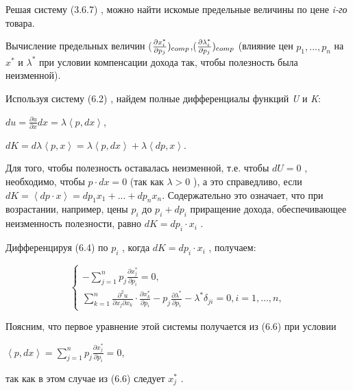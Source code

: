 \documentclass[12pt, 4paper]{book}
\begin{document}
{Решая систему (3.6.7) , можно найти искомые предельные величины по цене \textit{i-го} товара. 
\par

Вычисление предельных величин ($\frac{\partial x_{i}^{*}}{\partial p_j})_{\text comp}$,($\frac{\partial \lambda_{i}^{*}}{\partial p_j})_{\text comp}$ (влияние цен $p_1,...,p_n$ на $x^{*}$ и $\lambda^{*}$ при условии компенсации дохода так, чтобы полезность была неизменной).
\par

Используя систему (6.2) , найдем полные дифференциалы функций \textit{U} и \textit{K}: 
\begin{center}
$du=\frac{\partial u}{\partial x}dx = \lambda\left\langle p,dx\right\rangle$,
\end{center}
\begin{center}
$dK=d\lambda\left\langle p,x\right\rangle = \lambda\left\langle p,dx\right\rangle + \lambda\left\langle dp,x\right\rangle$.
\end{center}
\par

Для того, чтобы полезность оставалась неизменной, т.е. чтобы $dU=0$ , необходимо, чтобы $p\cdot dx =0$ (так как $\lambda >0$ ), а это справедливо, если $dK = \left\langle dp \cdot x\right\rangle = d p_1 x_1 + ... + dp_n x_n$. Содержательно это означает, что при возрастании, например, цены $p_i$ до $p_i+dp_i$ приращение дохода, обеспечивающее неизменность полезности, равно $dK=dp_i\cdot x_i$ . 
\par

Дифференцируя (6.4) по $p_i$ , когда $dK=dp_i \cdot x_i$ , получаем:
\begin{center}
$$\left\{
\begin{aligned}
-\sum\limits_{j=1}^{n} p_j \frac{\partial x_{j}^{*}}{\partial p_i} = 0,\\
\sum\limits_{k=1}^{n}\frac{\partial^2 u}{\partial x_j \partial x_k}\cdot \frac{\partial x_{k}^{*}}{\partial p_i}- p_j\frac{\partial \lambda^{*}}{\partial p_i} - \lambda^{*}\delta_{ji}=0,i=1,...,n,
\end{aligned}
\right.$$
\end{center}
\par

Поясним, что первое уравнение этой системы получается из (6.6) при условии 
\begin{center}
$\left\langle p,dx\right\rangle=\sum\limits_{j=1}^{n}p_j\frac{\partial x_{j}^{*}}{\partial p_i}=0,$
\end{center}
так как в этом случае из (6.6) следует $x_{j}^{*}$ . 
\par

}
\end{document}
